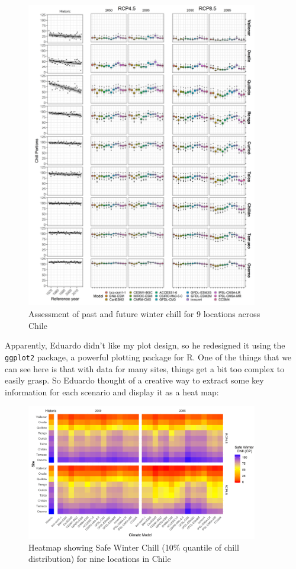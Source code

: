 \documentclass[
]{book}
\begin{document}
\begin{figure}
\centering
\includegraphics[width=0.9\textwidth,height=\textheight]{pictures/Chile_chill_all.png}
\caption{Assessment of past and future winter chill for 9 locations across Chile}
\end{figure}

Apparently, Eduardo didn't like my plot design, so he redesigned it using the \texttt{ggplot2} package, a powerful plotting package for R. One of the things that we can see here is that with data for many sites, things get a bit too complex to easily grasp. So Eduardo thought of a creative way to extract some key information for each scenario and display it as a heat map:

\begin{figure}
\centering
\includegraphics[width=0.9\textwidth,height=\textheight]{pictures/Chile_chill_heatmap.png}
\caption{Heatmap showing Safe Winter Chill (10\% quantile of chill distribution) for nine locations in Chile}
\end{figure}
\end{document}
